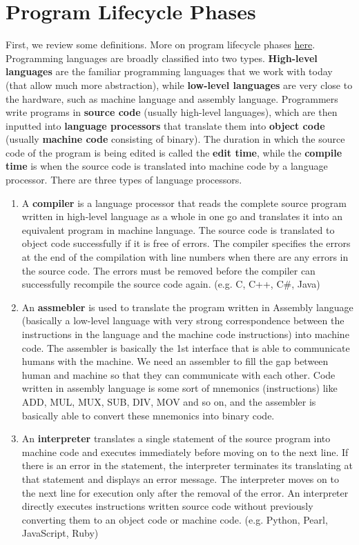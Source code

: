 \section{Program Lifecycle Phases}

  First, we review some definitions. More on program lifecycle phases \href{https://en.wikipedia.org/wiki/Program_lifecycle_phase}{here}. Programming languages are broadly classified into two types. \textbf{High-level languages} are the familiar programming languages that we work with today (that allow much more abstraction), while \textbf{low-level languages} are very close to the hardware, such as machine language and assembly language. Programmers write programs in \textbf{source code} (usually high-level languages), which are then inputted into \textbf{language processors} that translate them into \textbf{object code} (usually \textbf{machine code} consisting of binary). The duration in which the source code of the program is being edited is called the \textbf{edit time}, while the \textbf{compile time} is when the source code is translated into machine code by a language processor. There are three types of language processors.
  \begin{enumerate}
    \item A \textbf{compiler} is a language processor that reads the complete source program written in high-level language as a whole in one go and translates it into an equivalent program in machine language. The source code is translated to object code successfully if it is free of errors. The compiler specifies the errors at the end of the compilation with line numbers when there are any errors in the source code. The errors must be removed before the compiler can successfully recompile the source code again. (e.g. C, C++, C\#, Java)
    
    \item An \textbf{assmebler} is used to translate the program written in Assembly language (basically a low-level language with very strong correspondence between the instructions in the language and the machine code instructions) into machine code. The assembler is basically the 1st interface that is able to communicate humans with the machine. We need an assembler to fill the gap between human and machine so that they can communicate with each other. Code written in assembly language is some sort of mnemonics (instructions) like ADD, MUL, MUX, SUB, DIV, MOV and so on, and the assembler is basically able to convert these mnemonics into binary code.

    \item An \textbf{interpreter} translates a single statement of the source program into machine code and executes immediately before moving on to the next line. If there is an error in the statement, the interpreter terminates its translating at that statement and displays an error message. The interpreter moves on to the next line for execution only after the removal of the error. An interpreter directly executes instructions written source code without previously converting them to an object code or machine code. (e.g. Python, Pearl, JavaScript, Ruby)
  \end{enumerate}
